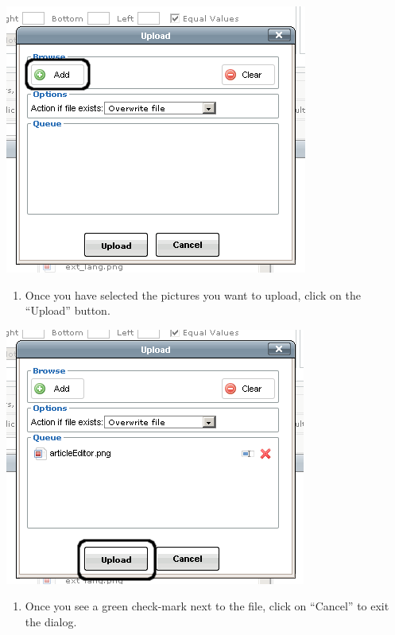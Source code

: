 \documentclass[letterpaper,10pt,english]{manual}
\begin{document}
{\hfill\includegraphics{articleInsertPictureUploadDialog1.png}\hfill}
\begin{enumerate}
\item {} 
Once you have selected the pictures you want to upload, click on the “Upload” button.

\end{enumerate}

{\hfill\includegraphics{articleInsertPictureUploadButton1.png}\hfill}
\begin{enumerate}
\item {} 
Once you see a green check-mark next to the file, click on “Cancel” to exit the dialog.

\end{enumerate}
\end{document}
